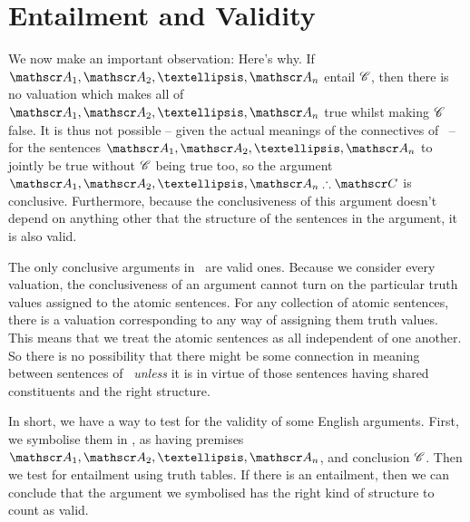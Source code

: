 \section{Entailment and Validity} \label{s:entailvalid}

We now make an important observation:
Here's why. If $\meta{A}_1, \meta{A}_2, …, \meta{A}_n$ entail $\mathscr{C}$, then there is no valuation which makes all of $\meta{A}_1, \meta{A}_2, …, \meta{A}_n$ true whilst making $\mathscr{C}$ false. It is thus not possible – given the actual meanings of the connectives of \TFL\ – for the sentences $\meta{A}_1, \meta{A}_2, …, \meta{A}_n$ to jointly be true without $\mathscr{C}$ being true too, so the argument $\meta{A}_1, \meta{A}_2, …, \meta{A}_n\ttherefore \meta{C}$ is conclusive. Furthermore, because the conclusiveness of this argument doesn't depend on anything other that the structure of the sentences in the argument, it is also valid. 

The only conclusive arguments in \TFL\ are valid ones. Because we consider every valuation, the conclusiveness of an argument cannot turn on the particular truth values assigned to the  atomic sentences. For any collection of atomic sentences, there is a valuation corresponding to any way of assigning them truth values. This means that we treat the atomic sentences as all independent of one another. So there is no possibility that there might be some connection in meaning between sentences of \TFL\ \emph{unless} it is in virtue of those sentences having shared constituents and the right structure.   

In short, we have a way to test for the validity of some English arguments. First, we symbolise them in \TFL, as having premises $\meta{A}_1, \meta{A}_2, …, \meta{A}_n$, and conclusion $\mathscr{C}$. Then we test for entailment using truth tables. If there is an entailment, then we can conclude that the argument we symbolised has the right kind of structure to count as valid.

